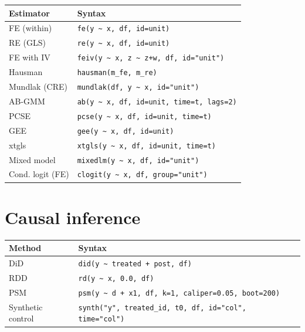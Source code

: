 \begin{center}
\begin{tabular}{ll}
\toprule
\textbf{Estimator} & \textbf{Syntax} \\
\midrule
FE (within)      & \texttt{fe(y \textasciitilde{} x, df, id=unit)} \\
RE (GLS)         & \texttt{re(y \textasciitilde{} x, df, id=unit)} \\
FE with IV       & \texttt{feiv(y \textasciitilde{} x, z \textasciitilde{} z+w, df, id="unit")} \\
Hausman          & \texttt{hausman(m\_fe, m\_re)} \\
Mundlak (CRE)    & \texttt{mundlak(df, y \textasciitilde{} x, id="unit")} \\
AB-GMM           & \texttt{ab(y \textasciitilde{} x, df, id=unit, time=t, lags=2)} \\
PCSE             & \texttt{pcse(y \textasciitilde{} x, df, id=unit, time=t)} \\
GEE              & \texttt{gee(y \textasciitilde{} x, df, id=unit)} \\
xtgls            & \texttt{xtgls(y \textasciitilde{} x, df, id=unit, time=t)} \\
Mixed model      & \texttt{mixedlm(y \textasciitilde{} x, df, id="unit")} \\
Cond. logit (FE) & \texttt{clogit(y \textasciitilde{} x, df, group="unit")} \\
\bottomrule
\end{tabular}
\end{center}

\section{Causal inference}

\begin{center}
\begin{tabular}{ll}
\toprule
\textbf{Method} & \textbf{Syntax} \\
\midrule
DiD              & \texttt{did(y \textasciitilde{} treated + post, df)} \\
RDD              & \texttt{rd(y \textasciitilde{} x, 0.0, df)} \\
PSM              & \texttt{psm(y \textasciitilde{} d + x1, df, k=1, caliper=0.05, boot=200)} \\
Synthetic control & \texttt{synth("y", treated\_id, t0, df, id="col", time="col")} \\
\bottomrule
\end{tabular}
\end{center}

